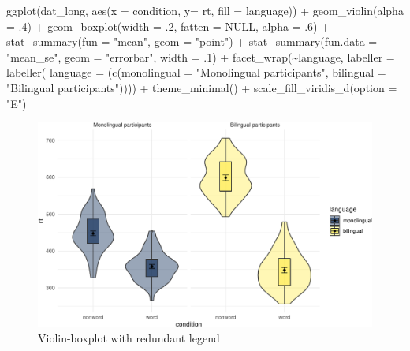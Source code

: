 \documentclass[
  english,
  doc,floatsintext]{apa6}
\newenvironment{Shaded}{\begin{snugshade}}{\end{snugshade}}
\newcommand{\AttributeTok}[1]{\textcolor[rgb]{0.77,0.63,0.00}{#1}}
\newcommand{\ConstantTok}[1]{\textcolor[rgb]{0.00,0.00,0.00}{#1}}
\newcommand{\DecValTok}[1]{\textcolor[rgb]{0.00,0.00,0.81}{#1}}
\newcommand{\FunctionTok}[1]{\textcolor[rgb]{0.00,0.00,0.00}{#1}}
\newcommand{\NormalTok}[1]{#1}
\newcommand{\SpecialCharTok}[1]{\textcolor[rgb]{0.00,0.00,0.00}{#1}}
\newcommand{\StringTok}[1]{\textcolor[rgb]{0.31,0.60,0.02}{#1}}
\begin{document}
\begin{Shaded}
\begin{Highlighting}[]
\FunctionTok{ggplot}\NormalTok{(dat\_long, }\FunctionTok{aes}\NormalTok{(}\AttributeTok{x =}\NormalTok{ condition, }\AttributeTok{y=}\NormalTok{ rt, }\AttributeTok{fill =}\NormalTok{ language)) }\SpecialCharTok{+}
  \FunctionTok{geom\_violin}\NormalTok{(}\AttributeTok{alpha =}\NormalTok{ .}\DecValTok{4}\NormalTok{) }\SpecialCharTok{+}
  \FunctionTok{geom\_boxplot}\NormalTok{(}\AttributeTok{width =}\NormalTok{ .}\DecValTok{2}\NormalTok{, }\AttributeTok{fatten =} \ConstantTok{NULL}\NormalTok{, }\AttributeTok{alpha =}\NormalTok{ .}\DecValTok{6}\NormalTok{) }\SpecialCharTok{+}
  \FunctionTok{stat\_summary}\NormalTok{(}\AttributeTok{fun =} \StringTok{"mean"}\NormalTok{, }\AttributeTok{geom =} \StringTok{"point"}\NormalTok{) }\SpecialCharTok{+}
  \FunctionTok{stat\_summary}\NormalTok{(}\AttributeTok{fun.data =} \StringTok{"mean\_se"}\NormalTok{, }\AttributeTok{geom =} \StringTok{"errorbar"}\NormalTok{, }\AttributeTok{width =}\NormalTok{ .}\DecValTok{1}\NormalTok{) }\SpecialCharTok{+}
  \FunctionTok{facet\_wrap}\NormalTok{(}\SpecialCharTok{\textasciitilde{}}\NormalTok{language, }
             \AttributeTok{labeller =} \FunctionTok{labeller}\NormalTok{(}
               \AttributeTok{language =}\NormalTok{ (}\FunctionTok{c}\NormalTok{(}\AttributeTok{monolingual =} \StringTok{"Monolingual participants"}\NormalTok{, }
                             \AttributeTok{bilingual =} \StringTok{"Bilingual participants"}\NormalTok{)))) }\SpecialCharTok{+}
  \FunctionTok{theme\_minimal}\NormalTok{() }\SpecialCharTok{+}
  \FunctionTok{scale\_fill\_viridis\_d}\NormalTok{(}\AttributeTok{option =} \StringTok{"E"}\NormalTok{)}
\end{Highlighting}
\end{Shaded}

\begin{figure}

{\centering \includegraphics[width=1\linewidth]{images/unnamed-chunk-22-1} 

}

\caption{Violin-boxplot with redundant legend}\label{fig:unnamed-chunk-22}
\end{figure}
\end{document}

